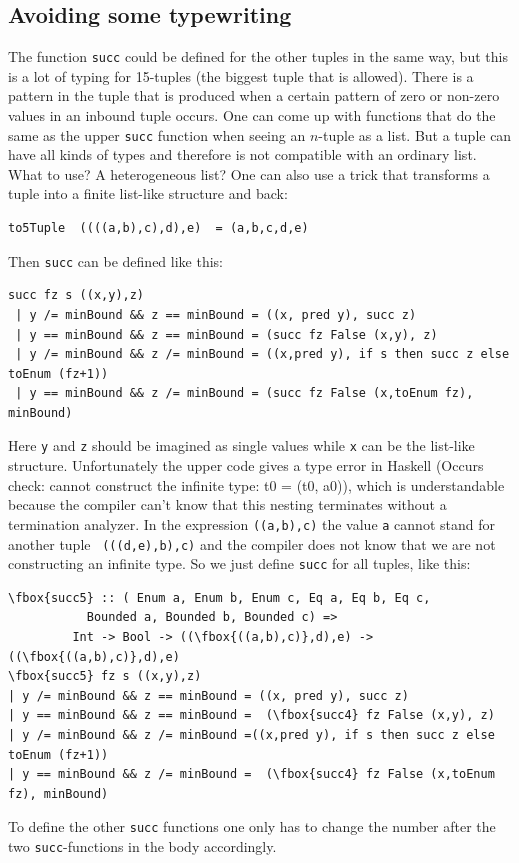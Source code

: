 \documentclass{tmr}
\newcommand{\authornote}[3]{{\color{#2} {\sc #1}: #3}}
\newcommand\bay[1]{\authornote{edward}{blue}{#1}}
\newcommand\tkv[1]{\authornote{Tillmann}{green}{#1}}
\begin{document}
\subsection{Avoiding some typewriting}


The function \verb|succ| could be defined for the other tuples in the same way, but this is a lot of typing for 15-tuples (the biggest tuple that is allowed). 
There is a pattern in the tuple that is produced when a certain pattern of zero or non-zero values in an inbound tuple occurs.
One can come up with functions that do the same as the upper \verb|succ| function when seeing an $n$-tuple as a list.
But a tuple can have all kinds of types and therefore is not compatible with an ordinary list. What to use? A heterogeneous list? One can also use a trick that transforms a tuple into a finite list-like structure and back:

\begin{Verbatim}
to5Tuple  ((((a,b),c),d),e)  = (a,b,c,d,e)
\end{Verbatim}

Then \verb|succ| can be defined like this:
\begin{Verbatim}
succ fz s ((x,y),z)
 | y /= minBound && z == minBound = ((x, pred y), succ z)
 | y == minBound && z == minBound = (succ fz False (x,y), z)
 | y /= minBound && z /= minBound = ((x,pred y), if s then succ z else toEnum (fz+1))
 | y == minBound && z /= minBound = (succ fz False (x,toEnum fz), minBound)
\end{Verbatim}
Here \verb|y| and \verb|z| should be imagined as single values while \verb|x| can be the list-like structure. 
Unfortunately the upper code gives a type error in Haskell (Occurs check: cannot construct the infinite type: t0 = (t0, a0)), which is understandable because the compiler can't know that this nesting terminates without a termination analyzer. In the expression \verb|((a,b),c)|  the value \verb|a| cannot stand for another tuple \eg\ \verb|(((d,e),b),c)| and the compiler does not know that we are not constructing an infinite type.
So we just define \verb|succ| for all tuples, like this:

\begin{Verbatim}[commandchars=\\\{\}]
\fbox{succ5} :: ( Enum a, Enum b, Enum c, Eq a, Eq b, Eq c,
           Bounded a, Bounded b, Bounded c) =>
         Int -> Bool -> ((\fbox{((a,b),c)},d),e) -> ((\fbox{((a,b),c)},d),e)
\fbox{succ5} fz s ((x,y),z)
| y /= minBound && z == minBound = ((x, pred y), succ z)
| y == minBound && z == minBound =  (\fbox{succ4} fz False (x,y), z)
| y /= minBound && z /= minBound =((x,pred y), if s then succ z else toEnum (fz+1))
| y == minBound && z /= minBound =  (\fbox{succ4} fz False (x,toEnum fz), minBound)
\end{Verbatim}
To define the other \verb|succ| functions one only has to change the number after the two \verb|succ|-functions in the body accordingly. 
\end{document}
